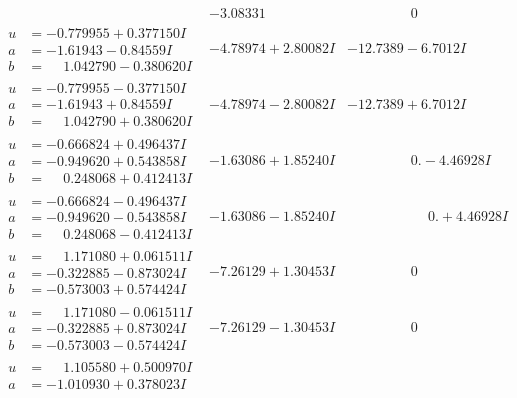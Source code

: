 \documentclass[1p]{elsarticle_modified}
\theoremstyle{definition}
\begin{document}
$$\begin{array}{c|c|c}
 & -3.08331\phantom{ +0.000000I} & \phantom{-0.000000 } 0 \\ \hline\begin{aligned}
u &= -0.779955 + 0.377150 I \\
a &= -1.61943 - 0.84559 I \\
b &= \phantom{-}1.042790 - 0.380620 I\end{aligned}
 & -4.78974 + 2.80082 I & -12.7389 - 6.7012 I \\ \hline\begin{aligned}
u &= -0.779955 - 0.377150 I \\
a &= -1.61943 + 0.84559 I \\
b &= \phantom{-}1.042790 + 0.380620 I\end{aligned}
 & -4.78974 - 2.80082 I & -12.7389 + 6.7012 I \\ \hline\begin{aligned}
u &= -0.666824 + 0.496437 I \\
a &= -0.949620 + 0.543858 I \\
b &= \phantom{-}0.248068 + 0.412413 I\end{aligned}
 & -1.63086 + 1.85240 I & \phantom{-0.000000 } 0. - 4.46928 I \\ \hline\begin{aligned}
u &= -0.666824 - 0.496437 I \\
a &= -0.949620 - 0.543858 I \\
b &= \phantom{-}0.248068 - 0.412413 I\end{aligned}
 & -1.63086 - 1.85240 I & \phantom{-0.000000 -}0. + 4.46928 I \\ \hline\begin{aligned}
u &= \phantom{-}1.171080 + 0.061511 I \\
a &= -0.322885 - 0.873024 I \\
b &= -0.573003 + 0.574424 I\end{aligned}
 & -7.26129 + 1.30453 I & \phantom{-0.000000 } 0 \\ \hline\begin{aligned}
u &= \phantom{-}1.171080 - 0.061511 I \\
a &= -0.322885 + 0.873024 I \\
b &= -0.573003 - 0.574424 I\end{aligned}
 & -7.26129 - 1.30453 I & \phantom{-0.000000 } 0 \\ \hline\begin{aligned}
u &= \phantom{-}1.105580 + 0.500970 I \\
a &= -1.010930 + 0.378023 I \\

\end{aligned}
\end{array}$$
\end{document}
